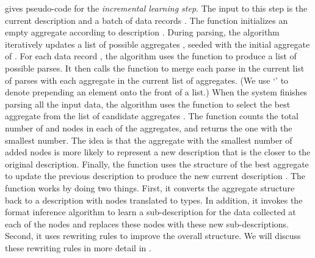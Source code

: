  gives pseudo-code for the {\em incremental
  learning step}.  The input to this step is the current description
 and a batch of data records .  The 
function initializes an empty aggregate according to description
.  During parsing, the algorithm iteratively updates a list of
possible aggregates , seeded with the initial aggregate of
.  For each data record , the algorithm uses the
 function to produce a list  of possible parses.  It
then calls the  function to merge each parse  in
the current list of parses with each aggregate  in the current
list of aggregates.  (We use `\cd{::}' to denote prepending an element
onto the front of a list.)  When the system finishes parsing all the
input data, the algorithm uses the  function to
select the best aggregate from the list of candidate aggregates
.  The  function counts the total number of
 and  nodes in each of the aggregates, and returns
the one with the smallest number.
The idea is that the aggregate with the smallest number of added nodes is 
more likely to represent a new description
that is the closer to the original description. 
Finally, the  function uses the structure of the best
aggregate to update the previous description  to produce the new
current description .  The  function works by
doing two things.
First, it converts the aggregate structure back to a \pads{} description
with  nodes translated to  types. In addition,
it invokes the \learnpads{} format inference
algorithm to learn a sub-description for the data collected 
at each of the  nodes
and replaces these  nodes with these new sub-descriptions. 
Second, it uses rewriting
rules to improve the overall structure.
We will discuss these rewriting rules in more
detail in .

